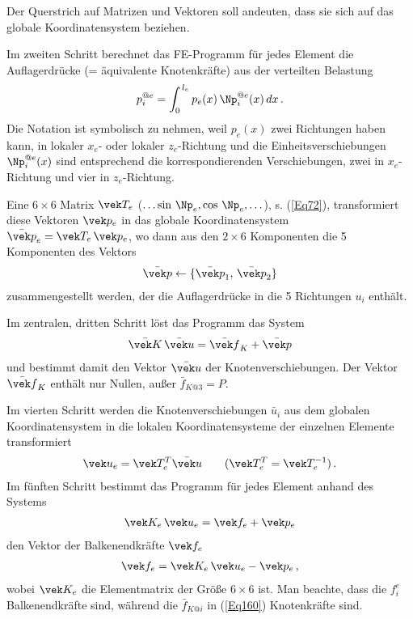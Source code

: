 Der Querstrich auf Matrizen und Vektoren soll andeuten, dass sie sich auf das globale Koordinatensystem beziehen.

Im zweiten Schritt berechnet das FE-Programm f\"{u}r jedes Element die Auflagerdr\"{u}cke (= \"{a}quivalente Knotenkr\"{a}fte) aus der verteilten Belastung
\begin{align}
p_i^{@e} = \int_0^{\,l_e} p_e(x)\,\Np_i^{@e}(x)\,dx\,.
\end{align}
Die Notation ist symbolisch zu nehmen, weil $p_e(x)$ zwei Richtungen haben kann, in lokaler $x_e$- oder lokaler $z_e$-Richtung und die Einheitsverschiebungen $\Np_i^{@e}(x)$ sind entsprechend die korrespondierenden Verschiebungen, zwei in $x_e$-Richtung und vier in $z_e$-Richtung.

Eine $6 \times 6$ Matrix $\vek T_e$ ($\ldots \sin\,\Np_e, \cos\,\Np_e, \ldots$), s. (\ref{Eq72}), transformiert diese Vektoren $\vek p_e$ in das globale Koordinatensystem $\bar{\vek p}_e = \vek T_e\,\vek p_e$, wo dann aus den $2 \times 6$ Komponenten die 5 Komponenten des Vektors
\begin{align}
\bar{\vek p} \leftarrow \{\bar{\vek p}_1,\, \bar{\vek p}_2\}
\end{align}
zusammengestellt werden, der die Auflagerdr\"{u}cke in die 5 Richtungen $u_i$ enth\"{a}lt.

Im zentralen, dritten Schritt l\"{o}st das Programm das System
\begin{align}\label{Eq160}
\bar{\vek K}\,\bar{\vek u} = \bar{\vek f}_K + \bar{\vek p}
\end{align}
und bestimmt damit den Vektor $\bar{\vek u}$ der Knotenverschiebungen. Der Vektor $\bar{\vek f}_K$ enth\"{a}lt nur Nullen, au{\ss}er $\bar{f}_{K @3} = P$.

Im vierten Schritt werden die Knotenverschiebungen $\bar{u}_i$ aus dem globalen Koordinatensystem in die lokalen Koordinatensysteme der einzelnen Elemente transformiert
\begin{align}
\vek u_e = \vek T_e^T \bar{\vek u} \qquad (\vek  T_e^T = \vek T_e^{-1})\,.
\end{align}
Im f\"{u}nften Schritt bestimmt das Programm f\"{u}r jedes Element anhand des Systems
\begin{align}
\vek K_e\,\vek u_e = \vek f_e + \vek p_e
\end{align}
den Vektor der Balkenendkr\"{a}fte $\vek f_e$
\begin{align}
\vek f_e = \vek K_e\,\vek u_e - \vek p_e\,,
\end{align}
wobei $\vek K_e$ die Elementmatrix der Gr\"{o}{\ss}e $6 \times 6$ ist. Man beachte, dass die $f_i^e$ Balkenendkr\"{a}fte sind, w\"{a}hrend die $\bar{f}_{K @i}$ in (\ref{Eq160}) Knotenkr\"{a}fte sind.


